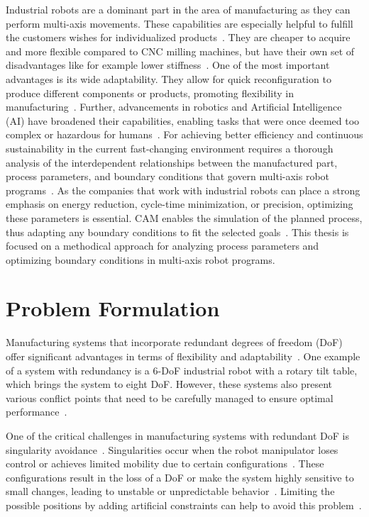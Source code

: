 Industrial robots are a dominant part in the area of manufacturing as they can perform multi-axis movements. These capabilities are especially helpful to fulfill the customers wishes for individualized products~\cite{Sherwani.2020}. They are cheaper to acquire and more flexible compared to CNC milling machines, but have their own set of disadvantages like for example lower stiffness~\cite{Iglesias.2015, Liberman.2021}. One of the most important advantages is its wide adaptability. They allow for quick reconfiguration to produce different components or products, promoting flexibility in manufacturing~\cite{Billard.2019}. Further, advancements in robotics and Artificial Intelligence (AI) have broadened their capabilities, enabling tasks that were once deemed too complex or hazardous for humans~\cite{Goel.2020}. \newline
For achieving better efficiency and continuous sustainability in the current fast-changing environment requires a thorough analysis of the interdependent relationships between the manufactured part, process parameters, and boundary conditions that govern multi-axis robot programs~\cite{Pan, Gadaleta.2019}. As the companies that work with industrial robots can place a strong emphasis on energy reduction, cycle-time minimization, or precision, optimizing these parameters is essential. CAM enables the simulation of the planned process, thus adapting any boundary conditions to fit the selected goals~\cite{Kyratsis.2020,Maiti.2017,Pan,Uhlmann.2016}.
This thesis is focused on a methodical approach for analyzing process parameters and optimizing boundary conditions in multi-axis robot programs. 

\section{Problem Formulation}\label{Problem Formulation}
Manufacturing systems that incorporate redundant degrees of freedom (DoF) offer significant advantages in terms of flexibility and adaptability~\cite{Anjum.2022}. One example of a system with redundancy is a 6-DoF industrial robot with a rotary tilt table, which brings the system to eight DoF. However, these systems also present various conflict points that need to be carefully managed to ensure optimal performance~\cite{Boscariol.2020, Liu.2022}.


One of the critical challenges in manufacturing systems with redundant DoF is singularity avoidance~\cite{Liu.2022}. Singularities occur when the robot manipulator loses control or achieves limited mobility due to certain configurations~\cite{Malyshev.2022}. These configurations result in the loss of a DoF or make the system highly sensitive to small changes, leading to unstable or unpredictable behavior~\cite{Zhao.2021, Milenkovic.2021}. Limiting the possible positions by adding artificial constraints can help to avoid this problem~\cite{Faria.2018}. %

